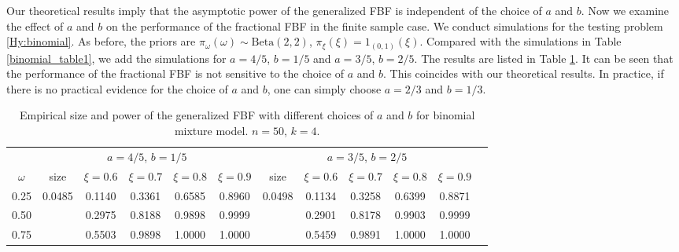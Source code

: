 \documentclass[11pt]{article}
\theoremstyle{plain}
\theoremstyle{definition}
\theoremstyle{remark}
\begin{document}
Our theoretical results imply that the asymptotic power of the generalized FBF is independent of the choice of $a$ and $b$.
Now we examine the effect of $a$ and $b$ on the performance of the fractional FBF in the finite sample case.
We conduct simulations for the testing problem \eqref{Hy:binomial}.
As before, the priors are $\pi_\omega(\omega)\sim \text{Beta}(2, 2)$, $\pi_\xi(\xi) = 1_{(0,1)}(\xi)$.
Compared with the simulations in Table \ref{binomial_table1}, we add the simulations for $a = 4/5$, $b = 1/5$ and $a = 3/5$, $b = 2/5$.
The results are listed in Table \ref{binomial_table3}.
It can be seen that the performance of the fractional FBF is not sensitive to the choice of $a$ and $b$.
This coincides with our theoretical results.
In practice, if there is no practical evidence for the choice of $a$ and $b$, one can simply choose $a = 2/3$ and $b = 1/3$.
\begin{table}[ht]
    \caption{Empirical size and power of the generalized FBF with different choices of $a$ and $b$ for binomial mixture model. $n=50$, $k = 4$.}
    \label{binomial_table3}
    \small
    \centering
    \begin{tabular}{cccccccccccc}
        \toprule
        & \multicolumn{5}{c}{$a = 4/5$, $b = 1/5$} &\multicolumn{5}{c}{$a = 3/5$, $b = 2/5$}\\
        \cmidrule(r){2-6}\cmidrule(r){7-11}
         $\omega$ 
        & size & $\xi= 0.6$& $\xi= 0.7$& $\xi= 0.8$& $\xi= 0.9$   
        & size & $\xi= 0.6$& $\xi= 0.7$& $\xi= 0.8$& $\xi= 0.9$
        \\ 
        \midrule
        0.25 & 0.0485  & 0.1140& 0.3361& 0.6585 & 0.8960 & 0.0498& 0.1134& 0.3258 & 0.6399 &0.8871 \\
        0.50   &       & 0.2975& 0.8188& 0.9898 & 0.9999 &       &0.2901 & 0.8178 & 0.9903 & 0.9999 \\
        0.75 &         &0.5503 & 0.9898& 1.0000 &1.0000&         &0.5459 & 0.9891 & 1.0000 & 1.0000 \\
        \bottomrule
    \end{tabular}
\end{table}

\end{document}

